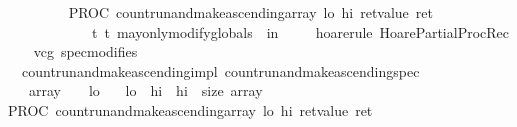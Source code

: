\begin{isabellebody}
\ \ \isanewline
\ \ {\isachardoublequoteopen}{\isasymforall}\ {\isasymsigma}{\isachardot}\ {\isasymGamma}{\isasymturnstile}\ {\isacharbraceleft}{\isasymsigma}{\isacharbraceright}\ PROC\ count{\isacharunderscore}run{\isacharunderscore}and{\isacharunderscore}make{\isacharunderscore}ascending{\isacharparenleft}{\isasymacute}array{\isacharcomma}\ {\isasymacute}lo{\isacharcomma}\ {\isasymacute}hi{\isacharcomma}\ {\isasymacute}ret{\isacharunderscore}value{\isacharcomma}\ {\isasymacute}ret{\isacharparenright}\isanewline
\ \ \ \ \ \ \ \ \ \ \ \ {\isacharbraceleft}t{\isachardot}\ t\ may{\isacharunderscore}only{\isacharunderscore}modify{\isacharunderscore}globals\ {\isasymsigma}\ in\ {\isacharbrackleft}{\isacharbrackright}{\isacharbraceright}{\isachardoublequoteclose}\isanewline
%
\isadelimproof
\ \ %
\endisadelimproof
%
\isatagproof
{}\isamarkupfalse%
\ {\isacharparenleft}hoare{\isacharunderscore}rule\ HoarePartial{\isachardot}ProcRec{}{\isacharparenright}\isanewline
\ \ \isamarkupfalse%
\ {\isacharparenleft}vcg\ spec{\isacharequal}modifies{\isacharparenright}\isanewline
\ \ \isamarkupfalse%
%
\endisatagproof
{\isafoldproof}%
%
\isadelimproof
\isanewline
%
\endisadelimproof
\isanewline
{}\isamarkupfalse%
\ {\isacharparenleft}\ count{\isacharunderscore}run{\isacharunderscore}and{\isacharunderscore}make{\isacharunderscore}ascending{\isacharunderscore}impl{\isacharparenright}\ count{\isacharunderscore}run{\isacharunderscore}and{\isacharunderscore}make{\isacharunderscore}ascending{\isacharunderscore}spec{\isacharcolon}\isanewline
{\isachardoublequoteopen}{\isasymforall}{\isasymsigma}{\isachardot}\ {\isasymGamma}{\isasymturnstile}\ {\isasymlbrace}{\isasymsigma}{\isachardot}\ {\isacharparenleft}{\isasymacute}array\ {\isasymnoteq}\ {\isacharbrackleft}{\isacharbrackright}{\isacharparenright}\ {\isasymand}\ {\isacharparenleft}{\isasymacute}lo\ {\isasymge}\ {}{\isacharparenright}\ {\isasymand}\isanewline
{\isacharparenleft}{\isasymacute}lo\ {\isacharless}\ {\isasymacute}hi{\isacharparenright}\ {\isasymand}\ {\isacharparenleft}{\isasymacute}hi\ {\isasymle}\ size\ {\isasymacute}array{\isacharparenright}\ {\isasymrbrace}\isanewline
PROC\ count{\isacharunderscore}run{\isacharunderscore}and{\isacharunderscore}make{\isacharunderscore}ascending{\isacharparenleft}{\isasymacute}array{\isacharcomma}\ {\isasymacute}lo{\isacharcomma}\ {\isasymacute}hi{\isacharcomma}\ {\isasymacute}ret{\isacharunderscore}value{\isacharcomma}\ {\isasymacute}ret{\isacharparenright}\isanewline

\end{isabellebody}
